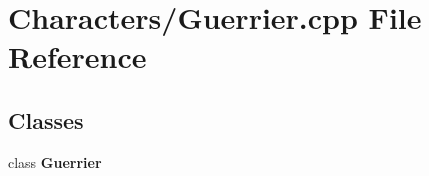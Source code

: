 \section{Characters/\-Guerrier.cpp File Reference}
\label{_guerrier_8cpp}
\subsection*{Classes}
\begin{DoxyCompactItemize}
\item 
class {\bf Guerrier}
\end{DoxyCompactItemize}
